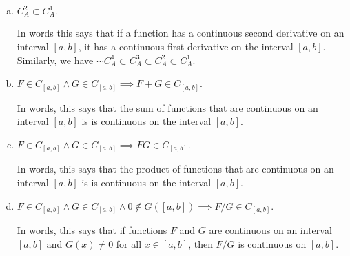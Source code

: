 \documentclass[12pt]{article}
\newenvironment{alphalist}{
  \begin{enumerate}[(a)]
    \addtolength{\itemsep}{-0.5\itemsep}}
  {\end{enumerate}}
\begin{document}
\begin{alphalist}  

\item $C_A^2  \subset C_A^1 .$

In words this says that if a function has a continuous second derivative on an interval $[a,b]$, it has a continuous first derivative on the interval $[a,b]$.
Similarly, we have $\cdots C_A^4 \subset C_A^3  \subset C_A^2  \subset C_A^1 $.

\item $F \in C_{[a,b]}\land G \in C_{[a,b]} \implies F+G \in C_{[a,b]}$. 

In words, this says that the sum of  functions that are continuous on an
interval $[a,b]$ is is continuous on the interval $[a,b]$.

\item $F \in C_{[a,b]}\land G \in C_{[a,b]} \implies F G \in C_{[a,b]}$. 

In words, this says that the product of  functions that are continuous on an
interval $[a,b]$ is is continuous on the interval $[a,b]$.

\item $F \in C_{[a,b]}\land G \in C_{[a,b]} \land 0 \notin G([a,b])  \implies F / G \in C_{[a,b]}$. 

In words, this says that if functions $F$ and $G$ are continuous on an interval $[a,b]$ and $G(x) \neq 0$ for all \(x \in [a,b]\), then $F/G$ is continuous on $[a,b]$.



\end{alphalist}
\end{document}
